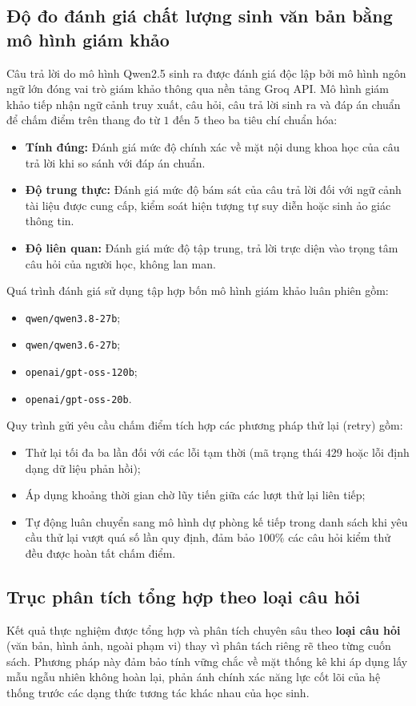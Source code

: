\subsection{Độ đo đánh giá chất lượng sinh văn bản bằng mô hình giám khảo}
\label{sec:judge_pha2}
Câu trả lời do mô hình Qwen2.5 sinh ra được đánh giá độc lập bởi mô hình ngôn ngữ lớn đóng vai trò giám khảo thông qua nền tảng Groq API. Mô hình giám khảo tiếp nhận ngữ cảnh truy xuất, câu hỏi, câu trả lời sinh ra và đáp án chuẩn để chấm điểm trên thang đo từ $1$ đến $5$ theo ba tiêu chí chuẩn hóa:
\begin{itemize}
    \item \textbf{Tính đúng:} Đánh giá mức độ chính xác về mặt nội dung khoa học của câu trả lời khi so sánh với đáp án chuẩn.
    \item \textbf{Độ trung thực:} Đánh giá mức độ bám sát của câu trả lời đối với ngữ cảnh tài liệu được cung cấp, kiểm soát hiện tượng tự suy diễn hoặc sinh ảo giác thông tin.
    \item \textbf{Độ liên quan:} Đánh giá mức độ tập trung, trả lời trực diện vào trọng tâm câu hỏi của người học, không lan man.
\end{itemize}

Quá trình đánh giá sử dụng tập hợp bốn mô hình giám khảo luân phiên gồm:
\begin{itemize}
    \item \texttt{qwen/qwen3.8-27b};
    \item \texttt{qwen/qwen3.6-27b};
    \item \texttt{openai/gpt-oss-120b};
    \item \texttt{openai/gpt-oss-20b}.
\end{itemize}
Quy trình gửi yêu cầu chấm điểm tích hợp các phương pháp thử lại (retry) gồm:
\begin{itemize}
    \item Thử lại tối đa ba lần đối với các lỗi tạm thời (mã trạng thái 429 hoặc lỗi định dạng dữ liệu phản hồi);
    \item Áp dụng khoảng thời gian chờ lũy tiến giữa các lượt thử lại liên tiếp;
    \item Tự động luân chuyển sang mô hình dự phòng kế tiếp trong danh sách khi yêu cầu thử lại vượt quá số lần quy định, đảm bảo $100\%$ các câu hỏi kiểm thử đều được hoàn tất chấm điểm.
\end{itemize}

\subsection{Trục phân tích tổng hợp theo loại câu hỏi}
\label{sec:truc_tong_hop}
Kết quả thực nghiệm được tổng hợp và phân tích chuyên sâu theo \textbf{loại câu hỏi} (văn bản, hình ảnh, ngoài phạm vi) thay vì phân tách riêng rẽ theo từng cuốn sách. Phương pháp này đảm bảo tính vững chắc về mặt thống kê khi áp dụng lấy mẫu ngẫu nhiên không hoàn lại, phản ánh chính xác năng lực cốt lõi của hệ thống trước các dạng thức tương tác khác nhau của học sinh.

